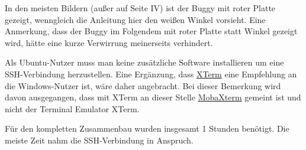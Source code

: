 \documentclass[12pt,twoside]{report}
\begin{document}
In den meisten Bildern (außer auf Seite IV) ist der Buggy mit roter Platte gezeigt, wenngleich die Anleitung hier den weißen Winkel vorsieht. Eine Anmerkung, dass der Buggy im Folgendem mit roter Platte statt Winkel gezeigt wird, hätte eine kurze Verwirrung meinerseits verhindert.

Als Ubuntu-Nutzer muss man keine zusätzliche Software installieren um eine SSH-Verbindung herzustellen. Eine Ergänzung, dass \href{https://invisible-island.net/xterm/}{XTerm} eine Empfehlung an die Windows-Nutzer ist, wäre daher angebracht. Bei dieser Bemerkung wird davon ausgegangen, dass mit XTerm an dieser Stelle \href{https://mobaxterm.mobatek.net/}{MobaXterm} gemeint ist und nicht der Terminal Emulator XTerm. 

Für den kompletten Zusammenbau wurden insgesamt 1 Stunden benötigt. Die meiste Zeit nahm die SSH-Verbindung in Anspruch.

\end{document}
